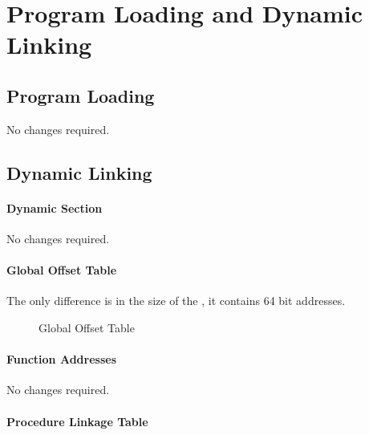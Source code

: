 \chapter{Program Loading and Dynamic Linking}

\section{Program Loading}

No changes required.


\section{Dynamic Linking}

\subsubsection{Dynamic Section}

No changes required.

\subsubsection{Global Offset Table}

The only difference is in the size of the , it
contains 64 bit addresses.

\begin{figure}[H]
\Hrule
\caption{Global Offset Table}
\begin{center}
\end{center}
\Hrule
\end{figure}

\subsubsection{Function Addresses}

No changes required.

\subsubsection{Procedure Linkage Table}



